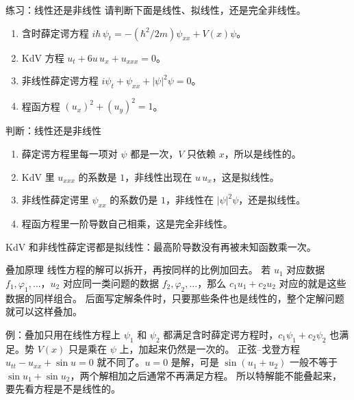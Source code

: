 \documentclass[fontset=windows, chinese, 10pt, xcolor=dvipsnames]{beamer}
\begin{document}
\begin{frame}{练习：线性还是非线性}
  请判断下面是线性、拟线性，还是完全非线性。
  \vspace{0.35em}
  \begin{enumerate}
    \item 含时薛定谔方程
      $i\hbar\,\psi_t=-(\hbar^2/2m)\psi_{xx}+V(x)\psi$。
    \item KdV 方程
      $u_t+6u\,u_x+u_{xxx}=0$。
    \item 非线性薛定谔方程
      $i\psi_t+\psi_{xx}+|\psi|^2\psi=0$。
    \item 程函方程
      $(u_x)^2+(u_y)^2=1$。
  \end{enumerate}
\end{frame}

\begin{frame}{判断：线性还是非线性}
  \begin{enumerate}
    \item 薛定谔方程里每一项对 $\psi$ 都是一次，$V$ 只依赖 $x$，所以是线性的。
    \item KdV 里 $u_{xxx}$ 的系数是 $1$，非线性出现在 $u\,u_x$，这是拟线性。
    \item 非线性薛定谔里 $\psi_{xx}$ 的系数仍是 $1$，非线性在 $|\psi|^2\psi$，还是拟线性。
    \item 程函方程里一阶导数自己相乘，这是完全非线性。
  \end{enumerate}
  \vspace{0.25em}
  KdV 和非线性薛定谔都是拟线性：最高阶导数没有再被未知函数乘一次。
\end{frame}

\begin{frame}{叠加原理}
  线性方程的解可以拆开，再按同样的比例加回去。
  \vspace{0.4em}
  若 $u_1$ 对应数据 $f_1,\varphi_1,\ldots$，$u_2$ 对应同一类问题的数据 $f_2,\varphi_2,\ldots$，那么 $c_1 u_1+c_2 u_2$ 对应的就是这些数据的同样组合。
  \vspace{0.35em}
  后面写定解条件时，只要那些条件也是线性的，整个定解问题就可以这样叠加。
\end{frame}

\begin{frame}{例：叠加只用在线性方程上}
  $\psi_1$ 和 $\psi_2$ 都满足含时薛定谔方程时，$c_1\psi_1+c_2\psi_2$ 也满足。势 $V(x)$ 只是乘在 $\psi$ 上，加起来仍然是一次的。
  \vspace{0.4em}
  正弦--戈登方程 $u_{tt}-u_{xx}+\sin u=0$ 就不同了。$u=0$ 是解，可是 $\sin(u_1+u_2)$ 一般不等于 $\sin u_1+\sin u_2$，两个解相加之后通常不再满足方程。
  \vspace{0.3em}
  所以特解能不能叠起来，要先看方程是不是线性的。
\end{frame}
\end{document}
